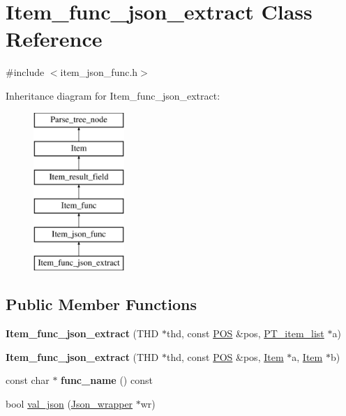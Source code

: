 \hypertarget{classItem__func__json__extract}{}\section{Item\+\_\+func\+\_\+json\+\_\+extract Class Reference}
\label{classItem__func__json__extract}


{\ttfamily \#include $<$item\+\_\+json\+\_\+func.\+h$>$}

Inheritance diagram for Item\+\_\+func\+\_\+json\+\_\+extract\+:\begin{figure}[H]
\begin{center}
\leavevmode
\includegraphics[height=6.000000cm]{classItem__func__json__extract}
\end{center}
\end{figure}
\subsection*{Public Member Functions}
\begin{DoxyCompactItemize}
\item 
\mbox{\label{classItem__func__json__extract_a395087f83725e15557660c37a37577db}} 
{\bfseries Item\+\_\+func\+\_\+json\+\_\+extract} (T\+HD $\ast$thd, const \mbox{\hyperlink{structYYLTYPE}{P\+OS}} \&pos, \mbox{\hyperlink{classPT__item__list}{P\+T\+\_\+item\+\_\+list}} $\ast$a)
\item 
\mbox{\label{classItem__func__json__extract_a77b8f1d32361065214e880bba3d36406}} 
{\bfseries Item\+\_\+func\+\_\+json\+\_\+extract} (T\+HD $\ast$thd, const \mbox{\hyperlink{structYYLTYPE}{P\+OS}} \&pos, \mbox{\hyperlink{classItem}{Item}} $\ast$a, \mbox{\hyperlink{classItem}{Item}} $\ast$b)
\item 
\mbox{\label{classItem__func__json__extract_acce661d794bcc5a0eff603943989650b}} 
const char $\ast$ {\bfseries func\+\_\+name} () const
\item 
bool \mbox{\hyperlink{classItem__func__json__extract_ab775e6ae9faf1c5df20596fea217f383}{val\+\_\+json}} (\mbox{\hyperlink{classJson__wrapper}{Json\+\_\+wrapper}} $\ast$wr)
\end{DoxyCompactItemize}

